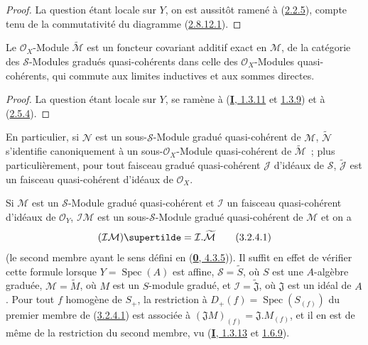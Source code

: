 \begin{proof}
La question étant locale sur $Y$, on est aussitôt ramené à
(\hyperref[II.2.2.5-fr]{2.2.5}), compte tenu de la commutativité du diagramme
(\hyperref[II.2.8.12.1-fr]{2.8.12.1}).
\end{proof}

\begin{proposition}[3.2.4]
\label{II.3.2.4-fr}
Le $\mathcal{O}_X$-Module $\widetilde{\mathcal{M}}$ est un foncteur covariant
additif exact en $\mathcal{M}$, de la catégorie des $\mathcal{S}$-Modules
gradués quasi-cohérents dans celle des $\mathcal{O}_X$-Modules
quasi-cohérents, qui commute aux limites inductives et aux sommes directes.
\end{proposition}

\begin{proof}
La question étant locale sur $Y$, se ramène à
(\hyperref[I.1.3.11-fr]{\textbf{I}, 1.3.11} et
\hyperref[I.1.3.9-fr]{1.3.9}) et à
(\hyperref[II.2.5.4-fr]{2.5.4}).
\end{proof}

En particulier, si $\mathcal{N}$ est un sous-$\mathcal{S}$-Module gradué
quasi-cohérent de $\mathcal{M}$, $\widetilde{\mathcal{N}}$ s'identifie
canoniquement à un sous-$\mathcal{O}_X$-Module quasi-cohérent de
$\widetilde{\mathcal{M}}$~; plus particulièrement, pour tout faisceau gradué
quasi-cohérent $\mathcal{J}$ d'idéaux de $\mathcal{S}$,
$\widetilde{\mathcal{J}}$ est un faisceau quasi-cohérent d'idéaux de
$\mathcal{O}_X$.

Si $\mathcal{M}$ est un $\mathcal{S}$-Module gradué quasi-cohérent et
$\mathcal{I}$ un faisceau quasi-cohérent d'idéaux de $\mathcal{O}_Y$,
$\mathcal{I}\mathcal{M}$ est un sous-$\mathcal{S}$-Module gradué
quasi-cohérent de $\mathcal{M}$ et on a
\[
\label{II.3.2.4.1-fr}
  (\mathcal{I}\mathcal{M})\supertilde
  =\mathcal{I}.\widetilde{\mathcal{M}}
\tag{3.2.4.1}
\]
(le second membre ayant le sens défini en
(\hyperref[0.4.3.5-fr]{\textbf{0}, 4.3.5})). Il suffit en effet de vérifier cette
formule lorsque $Y=\operatorname{Spec}(A)$ est affine,
$\mathcal{S}=\widetilde{S}$, où $S$ est une $A$-algèbre graduée,
$\mathcal{M}=\widetilde{M}$,
où $M$ est un $S$-module gradué, et
$\mathcal{I}=\widetilde{\mathfrak{J}}$, où $\mathfrak{J}$ est un idéal de
$A$. Pour tout $f$ homogène de $S_+$, la restriction à
$D_+(f)=\operatorname{Spec}(S_{(f)})$ du premier membre de
(\hyperref[II.3.2.4.1-fr]{3.2.4.1}) est associée à
$(\mathfrak{J}M)_{(f)}=\mathfrak{J}.M_{(f)}$, et il en est de même de la
restriction du second membre, vu
(\hyperref[I.1.3.13-fr]{\textbf{I}, 1.3.13} et
\hyperref[I.1.6.9-fr]{1.6.9}).

